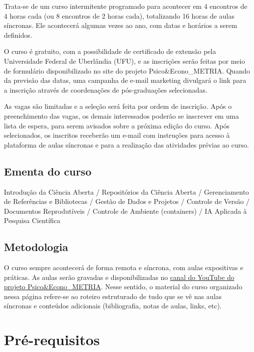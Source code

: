 \documentclass[
  a4paper,
]{article}
\begin{document}
Trata-se de um curso intermitente programado para acontecer em 4
encontros de 4 horas cada (ou 8 encontros de 2 horas cada), totalizando
16 horas de aulas síncronas. Ele acontecerá algumas vezes ao ano, com
datas e horários a serem definidos.

O curso é gratuito, com a possibilidade de certificado de extensão pela
Universidade Federal de Uberlândia (UFU), e as inscrições serão feitas
por meio de formulário disponibilizado no site do projeto
Psico\&Econo\_METRIA. Quando da previsão das datas, uma campanha de
e-mail marketing divulgará o link para a inscrição através de
coordenações de pós-graduações selecionadas.

As vagas são limitadas e a seleção será feita por ordem de inscrição.
Após o preenchimento das vagas, os demais interessados poderão se
inscrever em uma lista de espera, para serem avisados sobre a próxima
edição do curso. Após selecionados, os inscritos receberão um e-mail com
instruções para acesso à plataforma de aulas síncronas e para a
realização das atividades prévias ao curso.

\subsection*{Ementa do curso}\label{sec-ementa}


Introdução da Ciência Aberta / Repositórios da Ciência Aberta /
Gerenciamento de Referências e Bibliotecas / Gestão de Dados e Projetos
/ Controle de Versão / Documentos Reprodutíveis / Controle de Ambiente
(containers) / IA Aplicada à Pesquisa Científica

\subsection*{Metodologia}\label{sec-method}


O curso sempre acontecerá de forma remota e síncrona, com aulas
expositivas e práticas. As aulas serão gravadas e disponibilizadas no
\href{https://www.youtube.com/c/PsicoEconoMETRIA}{canal do YouTube do
projeto Psico\&Econo\_METRIA}. Nesse sentido, o material do curso
organizado nessa página refere-se ao roteiro estruturado de tudo que se
vê nas aulas síncronas e conteúdos adicionais (bibliografia, notas de
aulas, links, etc).


\section*{Pré-requisitos 📇}\label{sec-prework}
\end{document}

